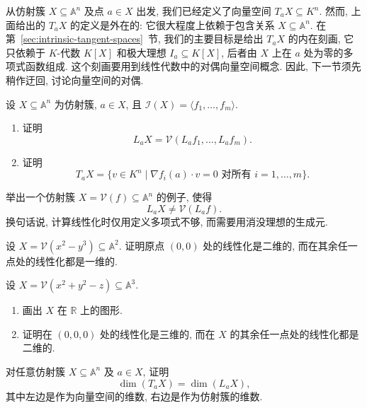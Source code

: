 从仿射簇 $X\subseteq\mathbb{A}^{n}$ 及点 $a\in X$ 出发, 我们已经定义了向量空间 $T_{a}X\subseteq K^{n}$. 然而, 上面给出的 $T_{a}X$ 的定义是外在的: 它很大程度上依赖于包含关系 $X\subseteq\mathbb{A}^{n}$. 在第~\ref{sec:intrinsic-tangent-spaces}~节, 我们的主要目标是给出 $T_{a}X$ 的内在刻画, 它只依赖于 $K$-代数 $K[X]$ 和极大理想 $I_{a}\subseteq K[X]$, 后者由 $X$ 上在 $a$ 处为零的多项式函数组成. 这个刻画要用到线性代数中的对偶向量空间概念. 因此, 下一节须先稍作迂回, 讨论向量空间的对偶.

\BookExerciseHeading
\begin{BookExercises}
  \item\label{ex:linearization-and-tangency-from-generators} 设 $X\subseteq\mathbb{A}^{n}$ 为仿射簇, $a\in X$, 且 $\mathcal{I}(X)=\langle f_{1},\ldots,f_{m}\rangle$.
  \begin{enumerate}
    \item 证明
    \[
      L_{a}X=\mathcal{V}(L_{a}f_{1},\ldots,L_{a}f_{m}).
    \]
    \item 证明
    \[
      T_{a}X=\{v\in K^{n}\mid\nabla f_{i}(a)\cdot v=0\text{ 对所有 }i=1,\ldots,m\}.
    \]
  \end{enumerate}
  \item\label{ex:defining-polynomial-insufficient-for-linearization} 举出一个仿射簇 $X=\mathcal{V}(f)\subseteq\mathbb{A}^{n}$ 的例子, 使得
  \[
    L_{a}X\neq\mathcal{V}(L_{a}f).
  \]
  换句话说, 计算线性化时仅用定义多项式不够, 而需要用消没理想的生成元.
  \item\label{ex:linearizations-of-cusp-at-origin-and-elsewhere} 设 $X=\mathcal{V}(x^{2}-y^{3})\subseteq\mathbb{A}^{2}$. 证明原点 $(0,0)$ 处的线性化是二维的, 而在其余任一点处的线性化都是一维的.
  \item\label{ex:compare-linearizations-of-paraboloid} 设 $X=\mathcal{V}(x^{2}+y^{2}-z)\subseteq\mathbb{A}^{3}$.
  \begin{enumerate}
    \item 画出 $X$ 在 $\mathbb{R}$ 上的图形.
    \item 证明在 $(0,0,0)$ 处的线性化是三维的, 而在 $X$ 的其余任一点处的线性化都是二维的.
  \end{enumerate}
  \item\label{ex:tangent-space-and-linearization-have-equal-dimension} 对任意仿射簇 $X\subseteq\mathbb{A}^{n}$ 及 $a\in X$, 证明
  \[
    \dim(T_{a}X)=\dim(L_{a}X),
  \]
  其中左边是作为向量空间的维数, 右边是作为仿射簇的维数.
\end{BookExercises}

